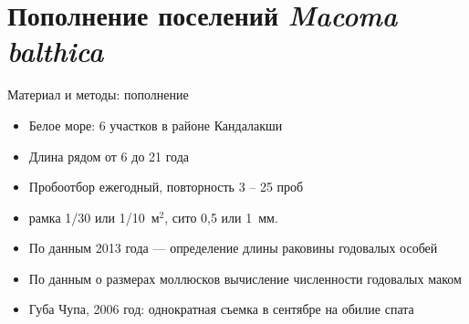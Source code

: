 \documentclass{beamer}
\begin{document}
		\section{Пополнение поселений {\it Macoma balthica}}
\begin{frame}{Материал и методы: пополнение}
\begin{itemize}
	\item Белое море: 6 участков в районе Кандалакши
	\item Длина рядом от 6 до 21 года
	\item Пробоотбор ежегодный, повторность 3 -- 25 проб
	\item рамка 1/30 или 1/10~м$^2$, сито 0,5 или 1~мм.
	\item По данным 2013 года --- определение длины раковины годовалых особей
	\item По данным о размерах моллюсков вычисление численности годовалых маком
	\item Губа Чупа, 2006 год: однократная съемка в сентябре на обилие спата
\end{itemize}
\end{frame}

%
\end{document}
